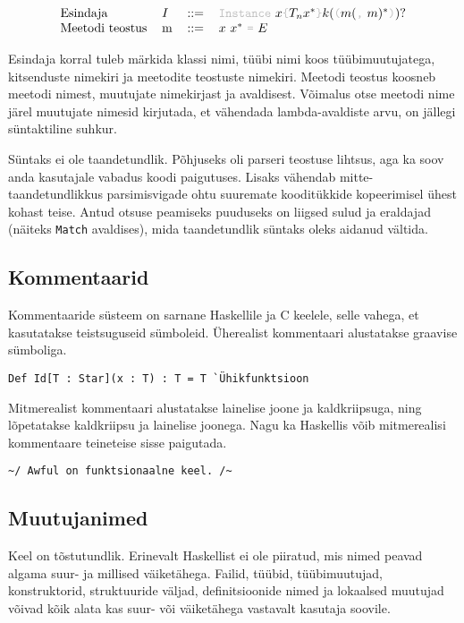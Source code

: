 \documentclass[12pt]{article}
\begin{document}
    \begin{equation*}
      \begin{tabular}{llll}
        Esindaja        & $I$ & $::=$ & {\color{helehall}\verb!Instance!} $x${\color{helehall}\verb!{!}$T_n x^*${\color{helehall}\verb!}!}$k(${\color{helehall}\verb!(!}$m(${\color{helehall}\verb!,!} $m)^*${\color{helehall}\verb!)!}$)?$ \\
        Meetodi teostus & m   & $::=$ & $x$ $x^*$ {\color{helehall}\verb!=!} $E$
      \end{tabular}
    \end{equation*}

    Esindaja korral tuleb märkida klassi nimi, tüübi nimi koos tüübimuutujatega, kitsenduste nimekiri ja meetodite teostuste nimekiri. Meetodi teostus koosneb meetodi nimest, muutujate nimekirjast ja avaldisest. Võimalus otse meetodi nime järel muutujate nimesid kirjutada, et vähendada lambda-avaldiste arvu, on jällegi süntaktiline suhkur.

    Süntaks ei ole taandetundlik. Põhjuseks oli parseri teostuse lihtsus, aga ka soov anda kasutajale vabadus koodi paigutuses. Lisaks vähendab mitte-taandetundlikkus parsimisvigade ohtu suuremate kooditükkide kopeerimisel ühest kohast teise. Antud otsuse peamiseks puuduseks on liigsed sulud ja eraldajad (näiteks \verb!Match! avaldises), mida taandetundlik süntaks oleks aidanud vältida.
    \subsection{Kommentaarid}\label{kommentaarid}
      Kommentaaride süsteem on sarnane Haskellile ja C keelele, selle vahega, et kasutatakse teistsuguseid sümboleid. Üherealist kommentaari alustatakse graavise sümboliga.

      \begin{verbatim}Def Id[T : Star](x : T) : T = T `Ühikfunktsioon\end{verbatim}

      Mitmerealist kommentaari alustatakse lainelise joone ja kaldkriipsuga, ning lõpetatakse kaldkriipsu ja lainelise joonega. Nagu ka Haskellis võib mitmerealisi kommentaare teineteise sisse paigutada.

      \begin{verbatim}~/ Awful on funktsionaalne keel. /~\end{verbatim}
    \subsection{Muutujanimed}\label{muutujanimed}
      Keel on tõstutundlik. Erinevalt Haskellist ei ole piiratud, mis nimed peavad algama suur- ja millised väiketähega. Failid, tüübid, tüübimuutujad, konstruktorid, struktuuride väljad, definitsioonide nimed ja lokaalsed muutujad võivad kõik alata kas suur- või väiketähega vastavalt kasutaja soovile.
\end{document}
